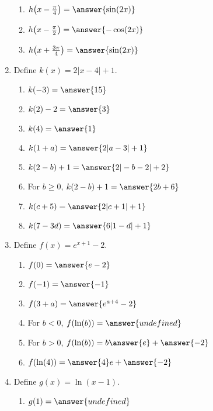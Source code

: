 \documentclass{ximera}
\begin{document}
\begin{exercise}
\begin{enumerate}
\begin{enumerate}
\item $h\!\left(x-\frac{\pi}{4}\right) = \answer{\sin(2x)}$

\item $h\!\left(x-\frac{\pi}{2}\right) = \answer{-\cos(2x)}$

\item $h\!\left(x+\frac{3\pi}{4}\right) = \answer{\sin(2x)}$
\end{enumerate}


\item Define $k(x)= 2|x-4|+1$.
\begin{enumerate}
\item $k(-3) = \answer{15}$

\item $k(2) -2 = \answer{3}$

\item $k(4) = \answer{1}$

\item $k(1+a)=\answer{2|a-3| +1}$

\item $k(2-b) +1 = \answer{2|-b-2|+2}$

\item For $b\geq0$, $k(2-b) +1 = \answer{2b+6}$

\item $k(c+5) = \answer{2|c+1|+1}$

\item $k(7-3d) = \answer{6|1-d|+1}$
\end{enumerate}

\item Define $f(x)= e^{x+1} -2$.
\begin{enumerate}
\item $f(0) = \answer{e-2}$

\item $f(-1) = \answer{-1}$

\item $f(3+a)=\answer{e^{a+4}-2}$

\item For $b<0$, $f(\ln(b)) = \answer{undefined}$

\item For $b>0$, $f(\ln(b)) = b\answer{e} + \answer{-2}$

\item $f(\ln(4)) = \answer{4}e + \answer{-2}$
\end{enumerate}

\item Define $g(x)= \ln(x-1)$.
\begin{enumerate}
\item $g(1) = \answer{undefined}$


\end{enumerate}
\end{enumerate}
\end{exercise}
\end{document}
